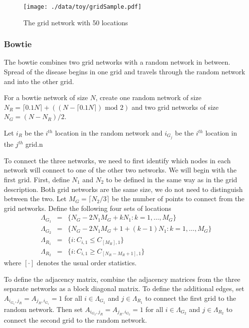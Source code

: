 \documentclass[11pt]{article}
\begin{document}
\begin{figure}[htb]
\centering
\texttt{[image: ./data/toy/gridSample.pdf]}
\caption{\label{fig:grid25}The grid network with 50 locations}
\end{figure}



\subsubsection{Bowtie}
\label{sec-3-1-5}

The bowtie combines two grid networks with a random network in
between.  Spread of the disease begins in one grid and travels through
the random network and into the other grid.

For a bowtie network of size $N$, create one random network of size
$N_R = \lceil 0.1 N \rceil + ((N - \lceil 0.1 N \rceil) \text{ mod }
2)$ and two grid networks of size $N_G = (N - N_R)/2$.

Let $i_{R}$ be the $i^{th}$ location in the random network and
$i_{G_j}$ be the $i^{th}$ location in the $j^{th}$ grid.n

To connect the three networks, we need to first identify which nodes
in each network will connect to one of the other two networks.  We
will begin with the first grid.  First, define $N_1$ and $N_2$ to be
defined in the same way as in the grid description.  Both grid
networks are the same size, we do not need to distinguish between the
two.  Let $M_{G} = \lceil N_2/3 \rceil$ be the number of points to
connect from the grid networks.  Define the following four sets of locations
\begin{equation*}
  \begin{array}{rcl}
    \Lambda_{G_1} & = & \lbrace N_G -
                        2N_1M_G + kN_1 : k = 1,\ldots,M_G\rbrace\\
    \Lambda_{G_2} & = & \lbrace N_G -
                        2N_1M_G + 1 + (k-1)N_1 : k =
                        1,\ldots,M_G\rbrace\\
    \Lambda_{R_1} & = & \lbrace i : C_{i,1} \le C_{[M_R],1} \rbrace\\
    \Lambda_{R_2} & = & \lbrace i : C_{i,1} \ge C_{[N_R - M_R + 1],1} \rbrace
  \end{array}
\end{equation*}
where $[\cdot]$ denotes the usual order statistics.

To define the adjacency matrix, combine the adjacency matrices from
the three separate networks as a block diagonal matrix.  To define the
additional edges, set $A_{i_{G_1},j_R} = A_{j_R,i_{G_1}} = 1$ for all
$i \in \Lambda_{G_1}$ and $j \in \Lambda_{R_1}$ to connect the first
grid to the random network.  Then set $A_{i_{G_2},j_R} =
A_{j_R,i_{G_2}} = 1$ for all $i \in \Lambda_{G_2}$ and $j \in
\Lambda_{R_2}$ to connect the second grid to the random network.
\end{document}
